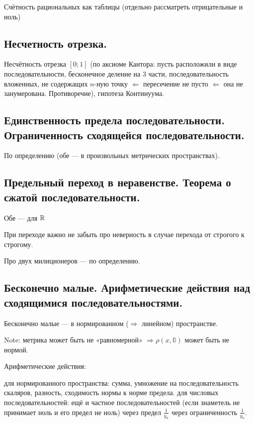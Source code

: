 \documentclass[12pt, a4paper]{article}
\begin{document}
Счётность рациональных как таблицы (отдельно рассматреть отрицательные и ноль)


\subsection{Несчетность отрезка.}

Несчётность отрезка $[0; 1]$ 
(по аксиоме Кантора: пусть расположили в виде последовательности, бесконечное деление на 3 части, последовательность вложенных, не содержащих $n$-ную точку $\Leftarrow$ пересечение не пусто $\Leftarrow$ она не занумерована. Противоречие), гипотеза Континуума.


\subsection{Единственность предела последовательности. Ограниченность сходящейся последовательности.}

По определению (обе — в произвольных метрических пространствах).

\subsection{Предельный переход в неравенстве. Теорема о сжатой последовательности.}

Обе — для ${\mathbb{R}}$

При переходе важно не забыть про неверность в случае перехода от строгого к строгому.

Про двух милиционеров — по определению.


\subsection{Бесконечно малые. Арифметические действия над сходящимися последовательностями.}

Бесконечно малые — в нормированном ($\Rightarrow$ линейном) пространстве.

Note: метрика может быть не «равномерной» $\Rightarrow \rho (x, \mathbb{0})$ может быть не нормой.

Арифметические действия: 

для нормированного пространства: сумма, умножение на последовательность скаляров, разность, сходимость нормы к норме предела.
для числовых последовательностей: ещё и частное последовательностей (если знаметель не принимает ноль и его предел не ноль) через предел $\frac{1}{y_n}$ через ограниченность $\frac{1}{y_n}$.
\end{document}

